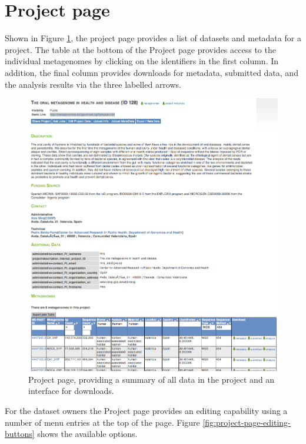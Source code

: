 \documentclass[12pt,fullpage]{report}
\begin{document}
\section{Project page}
Shown in Figure \ref{fig:project-page}, the project page provides a list of datasets and metadata for a project.
The table at the bottom of the Project page provides access to the individual metagenomes by clicking on the identifiers in the first column. In addition, the final column provides downloads for metadata, submitted data, and the analysis results via the three labelled arrows.

\begin{figure}
\begin{center}
\includegraphics[width=6in]{Images/project-page.png}
\end{center}
\caption{
Project page, providing a summary of all data in the project and an interface for downloads.
}
\label{fig:project-page}
\end{figure}

For the dataset owners the Project page provides an editing capability using a number of menu entries at the top of the page. Figure \ref{fig:project-page-editing-buttons} shows the available options.
\end{document}
